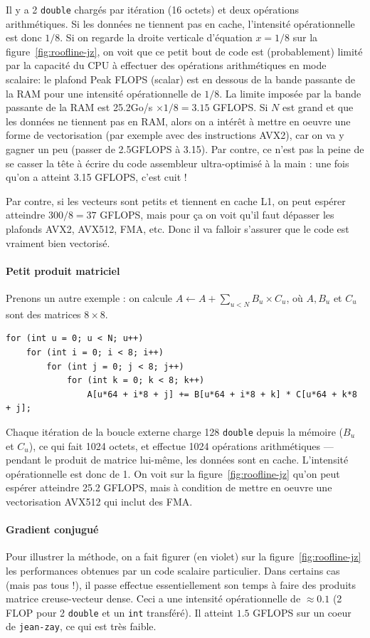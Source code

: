 Il y a 2 \texttt{double} chargés par itération (16 octets) et deux opérations
arithmétiques. Si les données ne tiennent pas en cache, l'intensité
opérationnelle est donc $1/8$. Si on regarde la droite verticale d'équation
$x=1/8$ sur la figure~\ref{fig:roofline-jz}, on voit que ce petit bout de code
est (probablement) limité par la capacité du CPU à effectuer des opérations
arithmétiques en mode \og scalaire\fg : le plafond \og Peak FLOPS (scalar)\fg
est en dessous de la bande passante de la RAM pour une intensité opérationnelle
de $1/8$. La limite imposée par la bande passante de la RAM est 25.2Go/s
$\times 1/8 = 3.15$ GFLOPS. Si $N$ est grand et que les données ne tiennent pas
en RAM, alors on a intérêt à mettre en oeuvre une forme de vectorisation (par
exemple avec des instructions AVX2), car on va y gagner un peu (passer de
2.5GFLOPS à 3.15). Par contre, ce n'est pas la peine de se casser la tête à
écrire du code assembleur ultra-optimisé à la main : une fois qu'on a atteint
3.15 GFLOPS, c'est cuit !

Par contre, si les vecteurs sont petits et tiennent en cache L1, on peut espérer
atteindre $300/8 = 37$ GFLOPS, mais pour ça on voit qu'il faut dépasser les
plafonds \og AVX2\fg, \og AVX512\fg, \og FMA\fg, etc. Donc il va falloir
s'assurer que le code est vraiment bien vectorisé.

\paragraph{Petit produit matriciel} Prenons un autre exemple : on calcule $A \gets A + \sum_{u<N} B_u \times C_u$,
où $A, B_u$ et $C_u$ sont des matrices $8 \times 8$.
\begin{verbatim}
for (int u = 0; u < N; u++)
    for (int i = 0; i < 8; i++)
        for (int j = 0; j < 8; j++)
            for (int k = 0; k < 8; k++)
                A[u*64 + i*8 + j] += B[u*64 + i*8 + k] * C[u*64 + k*8 + j];
\end{verbatim}

Chaque itération de la boucle externe charge 128 \texttt{double} depuis la
mémoire ($B_u$ et $C_u$), ce qui fait 1024 octets, et effectue 1024 opérations
arithmétiques --- pendant le produit de matrice lui-même, les données sont en
cache. L'intensité opérationnelle est donc de 1. On voit sur la
figure~\ref{fig:roofline-jz} qu'on peut espérer atteindre 25.2 GFLOPS, mais à
condition de mettre en oeuvre une vectorisation AVX512 qui inclut des FMA.

\paragraph{Gradient conjugué} Pour illustrer la méthode, on a fait figurer (en
violet) sur la figure~\ref{fig:roofline-jz} les performances obtenues par un
code scalaire particulier. Dans certains cas (mais pas tous !), il passe
effectue essentiellement son temps à faire des produits matrice creuse-vecteur
dense. Ceci a une intensité opérationnelle de $\approx 0.1$ (2 FLOP pour 2
\texttt{double} et un \texttt{int} transféré). Il atteint $1.5$ GFLOPS sur un
coeur de \texttt{jean-zay}, ce qui est très faible.

